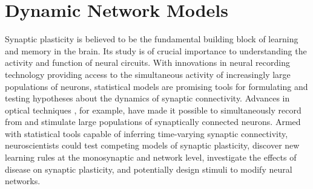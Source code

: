 
\chapter{Dynamic Network Models}



Synaptic plasticity is believed to be the fundamental building block
of learning and memory in the brain. Its study is of crucial
importance to understanding the activity and function of neural
circuits. With innovations in neural recording technology providing
access to the simultaneous activity of increasingly large populations
of neurons, statistical models are promising tools for formulating and
testing hypotheses about the dynamics of synaptic
connectivity. Advances in optical techniques \cite{Packer-2012,
  Hochbaum-2014}, for example, have made it possible to simultaneously
record from and stimulate large populations of synaptically connected
neurons. Armed with statistical tools capable of inferring
time-varying synaptic connectivity, neuroscientists could test
competing models of synaptic plasticity, discover new learning rules
at the monosynaptic and network level, investigate the effects of
disease on synaptic plasticity, and potentially design stimuli to
modify neural networks.


